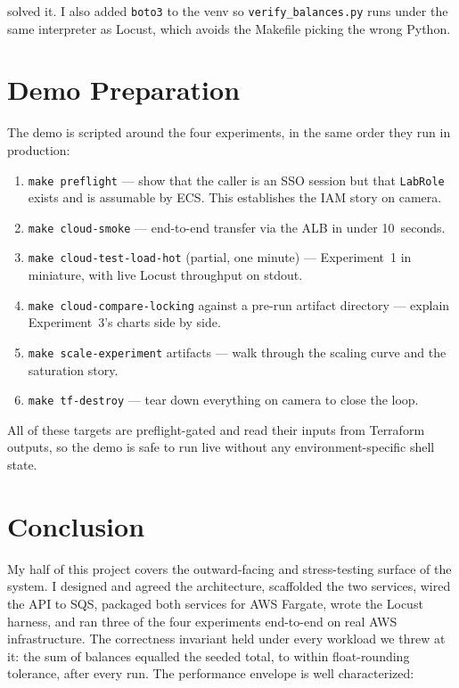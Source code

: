 \documentclass[11pt,a4paper]{article}
\begin{document}
solved it. I also added \texttt{boto3} to the venv so \texttt{verify\_balances.py} runs under the same interpreter as Locust, which avoids the Makefile picking the wrong Python.

\section{Demo Preparation}

The demo is scripted around the four experiments, in the same order they run in production:

\begin{enumerate}[leftmargin=*, itemsep=0.2em]
    \item \texttt{make preflight} --- show that the caller is an SSO session but that \texttt{LabRole} exists and is assumable by ECS. This establishes the IAM story on camera.
    \item \texttt{make cloud-smoke} --- end-to-end transfer via the ALB in under 10~seconds.
    \item \texttt{make cloud-test-load-hot} (partial, one minute) --- Experiment~1 in miniature, with live Locust throughput on stdout.
    \item \texttt{make cloud-compare-locking} against a pre-run artifact directory --- explain Experiment~3's charts side by side.
    \item \texttt{make scale-experiment} artifacts --- walk through the scaling curve and the saturation story.
    \item \texttt{make tf-destroy} --- tear down everything on camera to close the loop.
\end{enumerate}

All of these targets are preflight-gated and read their inputs from Terraform outputs, so the demo is safe to run live without any environment-specific shell state.

\section{Conclusion}

My half of this project covers the outward-facing and stress-testing surface of the system. I designed and agreed the architecture, scaffolded the two services, wired the API to SQS, packaged both services for AWS Fargate, wrote the Locust harness, and ran three of the four experiments end-to-end on real AWS infrastructure. The correctness invariant held under every workload we threw at it: the sum of balances equalled the seeded total, to within float-rounding tolerance, after every run. The performance envelope is well characterized:
\end{document}

